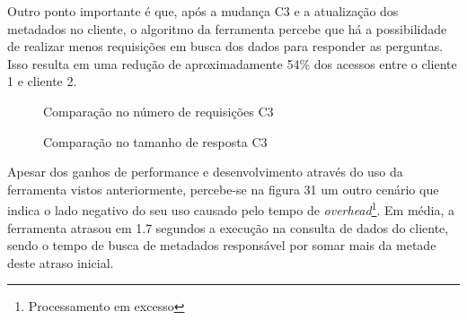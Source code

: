 \documentclass[12pt]{article}
\begin{document}
  Outro ponto importante é que, após a mudança C3 e a atualização dos metadados no cliente, o algoritmo da ferramenta percebe que há a possibilidade de realizar menos requisições em busca dos dados para responder as perguntas. Isso resulta em uma redução de aproximadamente 54\% dos acessos entre o cliente 1 e cliente 2.

  \begin{figure}[H]
    \centering
    \caption{Comparação no número de requisições C3}
  \end{figure}

  \begin{figure}[H]
    \centering
    \caption{Comparação no tamanho de resposta C3}
  \end{figure}

  Apesar dos ganhos de performance e desenvolvimento através do uso da ferramenta vistos anteriormente, percebe-se na figura 31 um outro cenário que indica o lado negativo do seu uso causado pelo tempo de \textit{overhead}\footnote{
    Processamento em excesso
  }. Em média, a ferramenta atrasou em 1.7 segundos a execução na consulta de dados do cliente, sendo o tempo de busca de metadados responsável por somar mais da metade deste atraso inicial.
\end{document}
